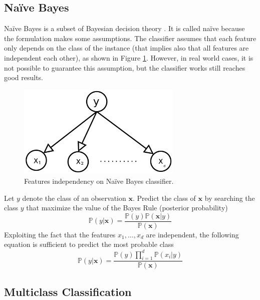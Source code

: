 \subsection{Na{\"i}ve Bayes}

Na{\"i}ve Bayes is a subset of Bayesian decision theory \cite{Taheri:2013:LNB:3062637.3062651}. It is called na{\"i}ve because the formulation makes some assumptions. The classifier assumes that each feature only depends on the class of the instance (that implies also that all features are independent each other), as shown in Figure \ref{fig:naive-bayes}. However, in real world cases, it is not possible to guarantee this assumption, but the classifier works still reaches good results.\\

\begin{figure}[ht]
	\centering
	\includegraphics[width=0.7\textwidth]{figures/naive-bayes.png}
	\caption{Features independency on Na{\"i}ve Bayes classifier.}
	\label{fig:naive-bayes}
\end{figure}

Let $y$ denote the class of an observation $\mathbf{x}$. Predict the class of $\mathbf{x}$ by searching the class $y$ that maximize the value of the Bayes Rule (posterior probability)
\[ \mathbb{P}(y | \mathbf{x}) = \frac{\mathbb{P}(y)\mathbb{P}(\mathbf{x} | y)}{\mathbb{P}(\mathbf{x})} \]
Exploiting  the fact that the features $x_1, \dots, x_d$ are independent, the following equation is sufficient to predict the most probable class
\[ \mathbb{P}(y | \mathbf{x}) = \frac{\mathbb{P}(y)\prod_{i=1}^{d}\mathbb{P}(x_i | y) }{\mathbb{P}(\mathbf{x})} \]





\subsection{Multiclass Classification}

